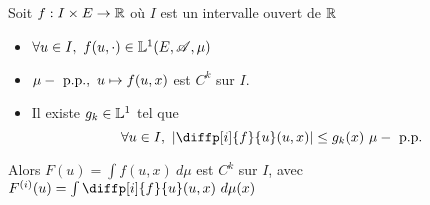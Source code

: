 \begin{theorem}
	Soit $f: I \times E \to \mathbb{R}$ où $I$ est un intervalle ouvert de $\mathbb{R}$\\

	\begin{itemize}
		\item $\forall u \in I, \ f(u,\cdot) \in \mathbb{L}^1(E,\mathscr{A},\mu)$
		\item $\mu-\text{ p.p.}, \ u \mapsto f(u,x)$ est $C^k$ sur $I$.
		\item Il existe $g_k\in \mathbb{L}^1$ tel que
		      $$ \forall u\in I,\ \left|\diffp[i]{f}{u}(u,x)\right| \leq g_k(x) \ \mupp$$
	\end{itemize}

	Alors $F(u) = \int f(u,x)\ d\mu$ est $C^k$ sur $I$, avec $F^{(i)}(u) = \int \diffp[i]{f}{u}(u,x) \ d\mu(x)$

\end{theorem}
